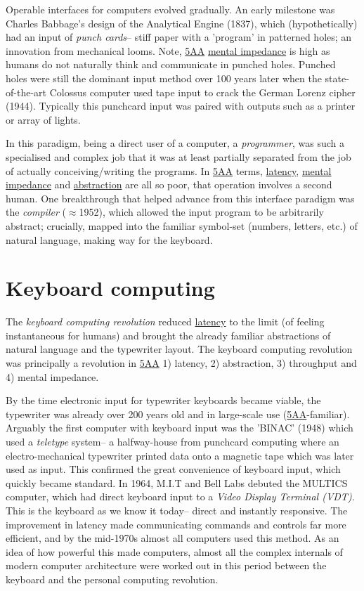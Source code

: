 \documentclass[logo,bsc,singlespacing,parskip]{infthesis}
\begin{document}
Operable interfaces for computers evolved gradually.
An early milestone was Charles Babbage's design of the Analytical Engine (1837), which (hypothetically) had an input of \emph{punch cards}-- stiff paper with a 'program' in patterned holes; an innovation from mechanical looms.
Note, \hyperref[org2644eb5]{5AA} \hyperref[mental impedance]{mental impedance} is high as humans do not naturally think and communicate in punched holes.
Punched holes were still the dominant input method over 100 years later when the state-of-the-art Colossus computer used tape input to crack the German Lorenz cipher (1944).
Typically this punchcard input was paired with outputs such as a printer or array of lights.

In this paradigm, being a direct user of a computer, a \emph{programmer}, was such a specialised and complex job that it was at least partially separated from the job of actually conceiving/writing the programs.
In \hyperref[org2644eb5]{5AA} terms, \hyperref[latency]{latency}, \hyperref[mental impedance]{mental impedance} and \hyperref[abstraction]{abstraction} are all so poor, that operation involves a second human.
One breakthrough that helped advance from this interface paradigm was the \emph{compiler} (\(\approx\)1952), which allowed the input program to be arbitrarily abstract; crucially, mapped into the familiar symbol-set (numbers, letters, etc.) of natural language, making way for the keyboard.

\section{Keyboard computing}
\label{sec:orgf9fb60e}
The \emph{keyboard computing revolution} reduced \hyperref[latency]{latency} to the limit (of feeling instantaneous for humans) and brought the already familiar abstractions of natural language and the typewriter layout.
The keyboard computing revolution was principally a revolution in \hyperref[org2644eb5]{5AA} 1) latency, 2) abstraction, 3) throughput and 4) mental impedance.

By the time electronic input for typewriter keyboards became viable, the typewriter was already over 200 years old and in large-scale use (\hyperref[org2644eb5]{5AA}-familiar).
Arguably the first computer with keyboard input was the 'BINAC' (1948) which used a \emph{teletype} system-- a halfway-house from punchcard computing where an electro-mechanical typewriter printed data onto a magnetic tape which was later used as input.
This confirmed the great convenience of keyboard input, which quickly became standard.
In 1964, M.I.T and Bell Labs debuted the MULTICS computer, which had direct keyboard input to a \emph{Video Display Terminal (VDT)}.
This is the keyboard as we know it today-- direct and instantly responsive.
The improvement in latency made communicating commands and controls far more efficient, and by the mid-1970s almost all computers used this method.
As an idea of how powerful this made computers, almost all the complex internals of modern computer architecture were worked out in this period between the keyboard and the personal computing revolution.
\end{document}
